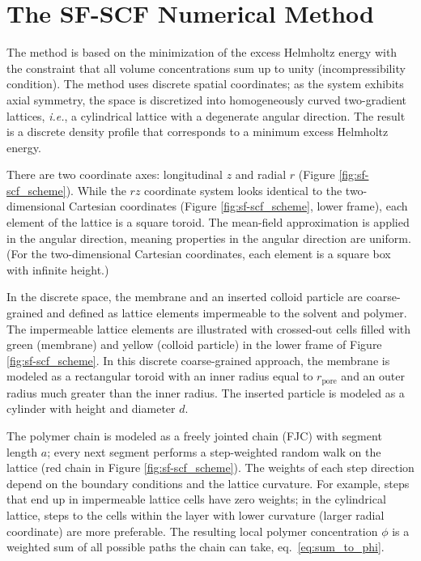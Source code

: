 \documentclass[10pt, a4paper]{article}
\begin{document}
\section{The SF-SCF Numerical Method}
\begin{multicols}{2}

The method is based on the minimization of the excess Helmholtz energy with the constraint that all volume concentrations sum up to unity (incompressibility condition).
The method uses discrete spatial coordinates; as the system exhibits axial symmetry, the space is discretized into homogeneously curved two-gradient lattices, \emph{i.e.}, a cylindrical lattice with a degenerate angular direction.
The result is a discrete density profile that corresponds to a minimum excess Helmholtz energy.

There are two coordinate axes: longitudinal $z$ and radial $r$ (Figure \ref{fig:sf-scf_scheme}).
While the $rz$ coordinate system looks identical to the two-dimensional Cartesian coordinates (Figure \ref{fig:sf-scf_scheme}, lower frame), each element of the lattice is a square toroid.
The mean-field approximation is applied in the angular direction, meaning properties in the angular direction are uniform.
(For the two-dimensional Cartesian coordinates, each element is a square box with infinite height.)

In the discrete space, the membrane and an inserted colloid particle are coarse-grained and defined as lattice elements impermeable to the solvent and polymer.
The impermeable lattice elements are illustrated with crossed-out cells filled with green (membrane) and yellow (colloid particle) in the lower frame of Figure \ref{fig:sf-scf_scheme}.
In this discrete coarse-grained approach, the membrane is modeled as a rectangular toroid with an inner radius equal to $r_{\textrm{pore}}$ and an outer radius much greater than the inner radius.
The inserted particle is modeled as a cylinder with height and diameter $d$.

The polymer chain is modeled as a freely jointed chain (FJC) with segment length $a$; every next segment performs a step-weighted random walk on the lattice (red chain in Figure \ref{fig:sf-scf_scheme}).
The weights of each step direction depend on the boundary conditions and the lattice curvature.
For example, steps that end up in impermeable lattice cells have zero weights; in the cylindrical lattice, steps to the cells within the layer with lower curvature (larger radial coordinate) are more preferable.
The resulting local polymer concentration $\phi$ is a weighted sum of all possible paths the chain can take, eq.~\ref{eq:sum_to_phi}.


\end{multicols}
\end{document}
